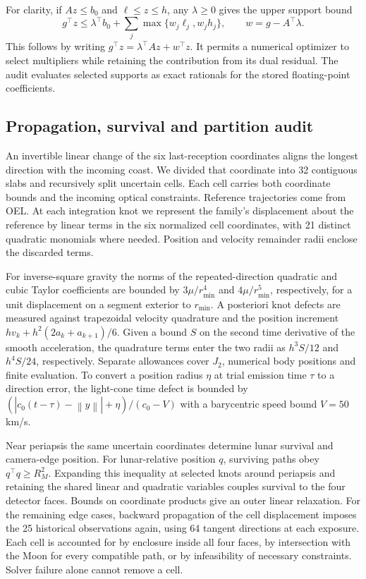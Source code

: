 \documentclass[10pt,letterpaper]{article}
\newcommand{\norm}[1]{\left\lVert #1\right\rVert}
\begin{document}
For clarity, if $Az\leq b_0$ and $\ell\leq z\leq h$, any $\lambda\geq0$ gives the upper support bound
\begin{equation}
 g^{\top}z\leq \lambda^{\top}b_0+
 \sum_j\max\{w_j\ell_j,w_j h_j\},\qquad w=g-A^{\top}\lambda.
 \label{eq:dual}
\end{equation}
This follows by writing $g^{\top}z=\lambda^{\top}Az+w^{\top}z$. It permits a numerical optimizer to select multipliers while retaining the contribution from its dual residual. The audit evaluates selected supports as exact rationals for the stored floating-point coefficients.

\subsection{Propagation, survival and partition audit}
An invertible linear change of the six last-reception coordinates aligns the longest direction with the incoming coast. We divided that coordinate into 32 contiguous slabs and recursively split uncertain cells. Each cell carries both coordinate bounds and the incoming optical constraints. Reference trajectories come from OEL. At each integration knot we represent the family's displacement about the reference by linear terms in the six normalized cell coordinates, with 21 distinct quadratic monomials where needed. Position and velocity remainder radii enclose the discarded terms.

For inverse-square gravity the norms of the repeated-direction quadratic and cubic Taylor coefficients are bounded by $3\mu/r_{\min}^4$ and $4\mu/r_{\min}^5$, respectively, for a unit displacement on a segment exterior to $r_{\min}$. A posteriori knot defects are measured against trapezoidal velocity quadrature and the position increment $h v_k+h^2(2a_k+a_{k+1})/6$. Given a bound $S$ on the second time derivative of the smooth acceleration, the quadrature terms enter the two radii as $h^3 S/12$ and $h^4 S/24$, respectively. Separate allowances cover $J_2$, numerical body positions and finite evaluation. To convert a position radius $\eta$ at trial emission time $\tau$ to a direction error, the light-cone time defect is bounded by $(|c_0(t-\tau)-\norm{y}|+\eta)/(c_0-V)$ with a barycentric speed bound $V=50$ km/s.

Near periapsis the same uncertain coordinates determine lunar survival and camera-edge position. For lunar-relative position $q$, surviving paths obey $q^{\top}q\ge R_M^2$. Expanding this inequality at selected knots around periapsis and retaining the shared linear and quadratic variables couples survival to the four detector faces. Bounds on coordinate products give an outer linear relaxation. For the remaining edge cases, backward propagation of the cell displacement imposes the 25 historical observations again, using 64 tangent directions at each exposure. Each cell is accounted for by enclosure inside all four faces, by intersection with the Moon for every compatible path, or by infeasibility of necessary constraints. Solver failure alone cannot remove a cell.
\end{document}
